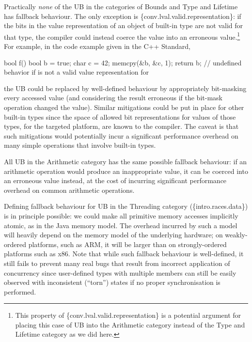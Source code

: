 Practically \emph{none} of the UB in the categories of Bounds and Type and Lifetime has fallback behaviour. The only exception is \{conv.lval.valid.representation\}: if the bits in the value representation of an object of built-in type are not valid for that type, the compiler could instead coerce the value into an erroneous value.\footnote{This property of \{conv.lval.valid.representation\} is a potential argument for placing this case of UB into the Arithmetic category instead of the Type and Lifetime category as we did here.} For example, in the code example given in the C++ Standard,

\begin{codeblock}
bool f() {
  bool b = true;
  char c = 42;
  memcpy(&b, &c, 1);
  return b;         // undefined behavior if  is not a valid value representation for 
}
\end{codeblock}

the UB could be replaced by well-defined behaviour by appropriately bit-masking every accessed  value (and considering the result erroneous if the bit-mask operation changed the value). Similar mitigations could be put in place for other built-in types since the space of allowed bit representations for values of those types, for the targeted platform, are known to the compiler. The caveat is that such mitigations would potentially incur a significant performance overhead on many simple operations that involve built-in types.

All UB in the Arithmetic category has the same possible fallback behaviour: if an arithmetic operation would produce an inappropriate value, it can be coerced into an erroneous value instead, at the cost of incurring significant performance overhead on common arithmetic operations.

Defining fallback behaviour for UB in the Threading category (\{intro.races.data\}) is in principle possible: we could make all primitive memory accesses implicitly atomic, as in the Java memory model. The overhead incurred by such a model will heavily depend on the memory model of the underlying hardware; on weakly-ordered platforms, such as ARM,
it will be larger than on strongly-ordered platforms such as x86. Note that while such fallback behaviour is well-defined, it still fails to prevent many real bugs that result from incorrect application of concurrency since user-defined types with multiple members can still be easily observed with inconsistent (``torn'') states if no proper synchronisation is performed.

